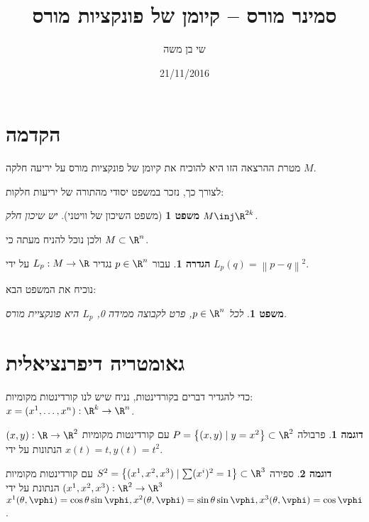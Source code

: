\documentclass{article}
\title{סמינר מורס – קיומן של פונקציות מורס}
\author{שי בן משה}
\date{21/11/2016}
\newtheorem{theorem}{משפט}
\newtheorem*{theorem*}{משפט}
\theoremstyle{definition}
\newtheorem*{definition*}{הגדרה}
\newtheorem*{example*}{דוגמה}
\newcommand{\norm}[1]{\left\lVert#1\right\rVert}
\begin{document}
	\maketitle
	
	
	\section{הקדמה}
	
	מטרת ההרצאה הזו היא להוכיח את קיומן של פונקציות מורס על יריעה חלקה \(M\).
	
	לצורך כך, נזכר במשפט יסודי מהתורה של יריעות חלקות:
	\begin{theorem*}[משפט השיכון של וויטני]
		יש שיכון חלק
		\(M \inj \R^{2k}\).
	\end{theorem*}
	ולכן נוכל להניח מעתה כי
	\(M\subset \R^n\).
	
	\begin{definition*}
		עבור
		\(p\in \R^n\)
		נגדיר
		\(L_p:M\to \R\)
		על ידי
		\(L_p(q)=\norm{p-q}^2\).
	\end{definition*}

	נוכיח את המשפט הבא:
	\begin{theorem}
		לכל
		\(p\in \R^n\),
		פרט לקבוצה ממידה 0, \(L_p\) היא פונקציית מורס.
	\end{theorem}


	\section{גאומטריה דיפרנציאלית}
	
	כדי להגדיר דברים בקורדינטות, נניח שיש לנו קורדינטות מקומיות:
	\(x=(x^1,\dotsc,x^n): \R^k \to \R^n\).
	
	\begin{example*}
		פרבולה
		\(P = \left\{(x,y) \mid y=x^2 \right\} \subset \R^2 \)
		עם קורדינטות מקומיות
		\((x,y): \R \to \R^2\)
		הנתונות על ידי
		\(x(t)=t, y(t)=t^2\).
	\end{example*}

	\begin{example*}
		ספירה
		\(S^2 = \left\{(x^1,x^2,x^3) \mid \sum (x^i)^2 = 1 \right\} \subset \R^3 \)
		עם קורדינטות מקומיות
		\((x^1,x^2,x^3): \R^2 \to \R^3\)
		הנתונת על ידי
		\(
			x^1(\theta, \vphi) = \cos\theta \sin\vphi,
			x^2(\theta, \vphi) = \sin\theta \sin\vphi,
			x^3(\theta, \vphi) = \cos\vphi
		\).
	\end{example*}
	
\end{document}
